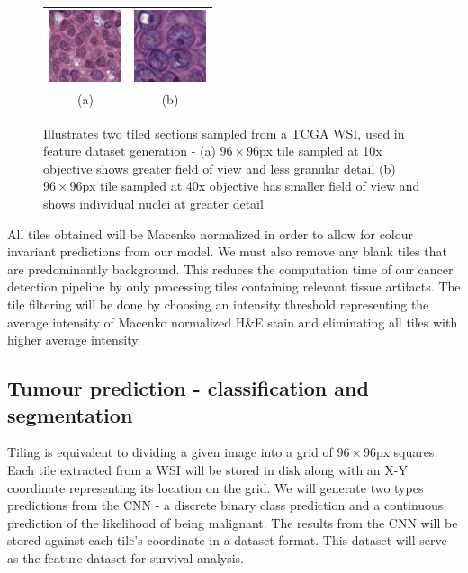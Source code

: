 \documentclass{l4proj}
\begin{document}
\begin{figure}[H]
\centering
\begin{tabular}{cc}
 \includegraphics[width=80px]{images/45_117.png}&
 \includegraphics[width=80px]{images/119_239.png}\\
 (a)&(b)\\
\end{tabular}
\caption{Illustrates two tiled sections sampled from a TCGA WSI, used in feature dataset generation - (a) \(96\times96\)px tile sampled at 10x objective shows greater field of view and less granular detail (b) \(96\times96\)px tile sampled at 40x objective has smaller field of view and shows individual nuclei at greater detail}
\label{fig:undersample-example}
\end{figure}

All tiles obtained will be Macenko normalized in order to allow for colour invariant predictions from our model. We must also remove any blank tiles that are predominantly background. This reduces the computation time of our cancer detection pipeline by only processing tiles containing relevant tissue artifacts. The tile filtering will be done by choosing an intensity threshold representing the average intensity of Macenko normalized H\&E stain and eliminating all tiles with higher average intensity. 

\subsection{Tumour prediction - classification and segmentation}
Tiling is equivalent to dividing a given image into a grid of \(96 \times 96\)px squares. Each tile extracted from a WSI will be stored in disk along with an X-Y coordinate representing its location on the grid. We will generate two types predictions from the CNN - a discrete binary class prediction and a continuous prediction of the likelihood of being malignant. The results from the CNN will be stored against each tile's coordinate in a dataset format. This dataset will serve as the feature dataset for survival analysis. 
\end{document}
